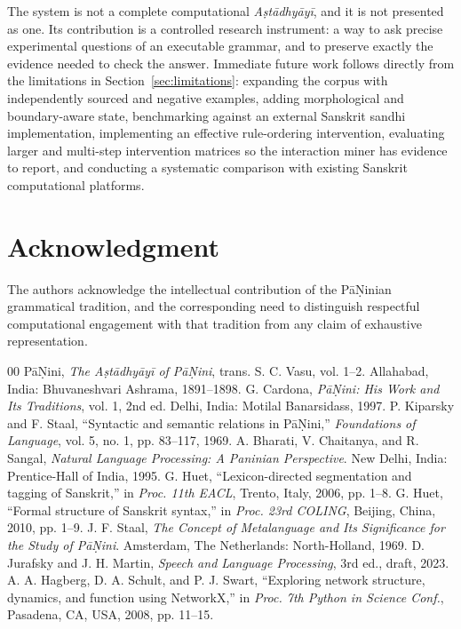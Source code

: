 \documentclass[conference]{IEEEtran}
\begin{document}
The system is not a complete computational \textit{A\d{s}t\=adhy\=ay\=i}, and it is not presented as one. Its contribution is a controlled research instrument: a way to ask precise experimental questions of an executable grammar, and to preserve exactly the evidence needed to check the answer. Immediate future work follows directly from the limitations in Section~\ref{sec:limitations}: expanding the corpus with independently sourced and negative examples, adding morphological and boundary-aware state, benchmarking against an external Sanskrit sandhi implementation, implementing an effective rule-ordering intervention, evaluating larger and multi-step intervention matrices so the interaction miner has evidence to report, and conducting a systematic comparison with existing Sanskrit computational platforms.

\section*{Acknowledgment}
The authors acknowledge the intellectual contribution of the P\={a}\d{N}inian grammatical tradition, and the corresponding need to distinguish respectful computational engagement with that tradition from any claim of exhaustive representation.

\balance
\begin{thebibliography}{00}
 P\={a}\d{N}ini, \textit{The A\d{s}t\=adhy\=ay\=i of P\={a}\d{N}ini}, trans. S. C. Vasu, vol. 1--2. Allahabad, India: Bhuvaneshvari Ashrama, 1891--1898.
 G. Cardona, \textit{P\={a}\d{N}ini: His Work and Its Traditions}, vol. 1, 2nd ed. Delhi, India: Motilal Banarsidass, 1997.
 P. Kiparsky and F. Staal, ``Syntactic and semantic relations in P\={a}\d{N}ini,'' \textit{Foundations of Language}, vol. 5, no. 1, pp. 83--117, 1969.
 A. Bharati, V. Chaitanya, and R. Sangal, \textit{Natural Language Processing: A Paninian Perspective}. New Delhi, India: Prentice-Hall of India, 1995.
 G. Huet, ``Lexicon-directed segmentation and tagging of Sanskrit,'' in \textit{Proc. 11th EACL}, Trento, Italy, 2006, pp. 1--8.
 G. Huet, ``Formal structure of Sanskrit syntax,'' in \textit{Proc. 23rd COLING}, Beijing, China, 2010, pp. 1--9.
 J. F. Staal, \textit{The Concept of Metalanguage and Its Significance for the Study of P\={a}\d{N}ini}. Amsterdam, The Netherlands: North-Holland, 1969.
 D. Jurafsky and J. H. Martin, \textit{Speech and Language Processing}, 3rd ed., draft, 2023.
 A. A. Hagberg, D. A. Schult, and P. J. Swart, ``Exploring network structure, dynamics, and function using NetworkX,'' in \textit{Proc. 7th Python in Science Conf.}, Pasadena, CA, USA, 2008, pp. 11--15.
\end{thebibliography}
\end{document}
